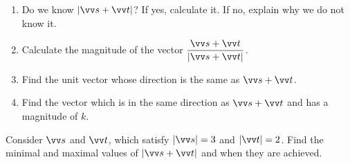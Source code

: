 \documentclass[11pt,pdfa,lastpage]{MishoNote}
\begin{document}
\begin{problems}
 \begin{enumerate}
   \item Do we know $|\vc s+\vc t|$? If yes, calculate it. If no, explain why we do not know it.
   \item Calculate the magnitude of the vector $\dfrac{\vc s+\vc t}{|\vc s+\vc t|}$.
   \item Find the unit vector whose direction is the same as $\vc s+\vc t$.
   \item Find the vector which is in the same direction as $\vc s+\vc t$ and has a magnitude of $k$.
 \end{enumerate}
\Problem[B] Consider $\vc s$ and $\vc t$, which satisfy $|\vc s|=3$ and $|\vc t|=2$. Find the minimal and maximal values of $|\vc s+\vc t|$ and when they are achieved.\label{prob:vec-max-min}
\end{problems}

\newpage
\end{document}
